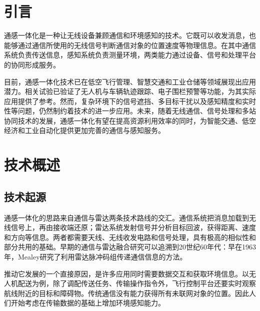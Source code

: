 \documentclass[12pt,a4paper,UTF8,fontset=fandol]{ctexart}
\begin{document}
\cover

\begin{abstract}

本文介绍通信感知一体化（ISAC）的应用场景和基本原理，围绕无人机配送、道路交通、仓储运输三类场景，具体说明通感系统部署的位置特点、使用哪些设备、获取什么信息以及怎样发挥作用。在此基础上，介绍系统的基本结构和技术特点，阐明了通感一体化技术在未来智能无线网络中的发展潜力及其面临的关键问题。

\end{abstract}
\thispagestyle{plain}
\clearpage

\tableofcontents
\thispagestyle{plain}
\clearpage
{}

\section{引言}

通感一体化是一种让无线设备兼顾通信和环境感知的技术。它既可以收发消息，也能够通过通信所使用的无线信号判断通信对象的位置速度等物理信息。在其中通信系统负责传送信息，感知系统负责测量环境，两类能力通过设备、信号和处理平台的协同形成服务。

目前，通感一体化技术已在低空飞行管理、智慧交通和工业仓储等领域展现出应用潜力。相关试验已验证了无人机与车辆轨迹跟踪、电子围栏预警等功能，为其实际应用提供了参考。然而，复杂环境下的信号遮挡、多目标干扰以及感知精度和实时性等问题，仍然制约着技术的进一步应用。未来，随着无线通信、信号处理和多站协同技术的发展，通感一体化有望在提高资源利用效率的同时，为智能交通、低空经济和工业自动化提供更加完善的通信与感知服务。

\section{技术概述}

\subsection{技术起源}

通感一体化的思路来自通信与雷达两条技术路线的交汇。通信系统把消息加载到无线信号上，再由接收端还原；雷达系统发射信号并分析目标回波，获得距离、速度和方向等信息。两者都需要天线、无线收发电路和信号处理，具有极高的相似性和部分共用的基础。早期的通信与雷达融合研究可以追溯到20世纪60年代：早在1963年，Mealey研究了利用雷达脉冲码组传递通信信息的方法\cite{mealey1963firstuse}。

推动它发展的一个直接原因，是许多应用同时需要数据交互和获取环境信息。以无人机配送为例，除了调配传送任务、传输操作指令外，飞行控制平台还要实时观察航线附近的目标和障碍物。传统通信没有能力获得所有未联网对象的位置。因此人们开始考虑在传输数据的基础上增加环境感知能力。
\end{document}

